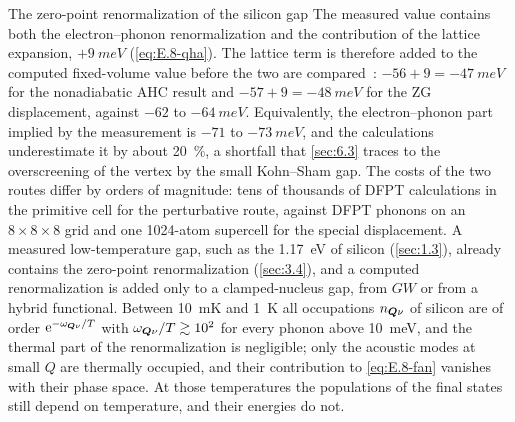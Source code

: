 \begin{workedexample}{The zero-point renormalization of the silicon gap}
The measured value contains both the electron--phonon renormalization and the contribution of the lattice expansion, $+\SI{9}{meV}$ (\cref{eq:E.8-qha}). The lattice term is therefore added to the computed fixed-volume value before the two are compared~\cite{miglio2020predominance}: $-56 + 9 = -\SI{47}{meV}$ for the nonadiabatic AHC result and $-57 + 9 = -\SI{48}{meV}$ for the ZG displacement, against $-62$ to $-\SI{64}{meV}$. Equivalently, the electron--phonon part implied by the measurement is $-71$ to $-\SI{73}{meV}$, and the calculations underestimate it by about \SI{20}{\percent}, a shortfall that \cref{sec:6.3} traces to the overscreening of the vertex by the small Kohn--Sham gap. The costs of the two routes differ by orders of magnitude: tens of thousands of DFPT calculations in the primitive cell for the perturbative route, against DFPT phonons on an $8\times8\times8$ grid and one 1024-atom supercell for the special displacement. A measured low-temperature gap, such as the \SI{1.17}{eV} of silicon (\cref{sec:1.3}), already contains the zero-point renormalization (\cref{sec:3.4}), and a computed renormalization is added only to a clamped-nucleus gap, from $GW$ or from a hybrid functional. Between \SI{10}{mK} and \SI{1}{K} all occupations $n_{\bm{Q}\nu}$ of silicon are of order $\mathrm{e}^{-\omega_{\bm{Q}\nu}/T}$ with $\omega_{\bm{Q}\nu}/T \gtrsim 10^2$ for every phonon above \SI{10}{meV}, and the thermal part of the renormalization is negligible; only the acoustic modes at small $Q$ are thermally occupied, and their contribution to \cref{eq:E.8-fan} vanishes with their phase space. At those temperatures the populations of the final states still depend on temperature, and their energies do not.
\end{workedexample}
